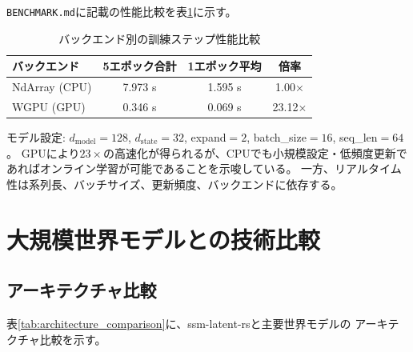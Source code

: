 \documentclass[11pt,a4paper]{ltjsarticle}
\begin{document}
\texttt{BENCHMARK.md}に記載の性能比較を表\ref{tab:benchmark}に示す。

\begin{table}[htbp]
  \centering
  \caption{バックエンド別の訓練ステップ性能比較}
  \label{tab:benchmark}
  \begin{tabular}{lccc}
    \toprule
    バックエンド & 5エポック合計 & 1エポック平均 & 倍率 \\
    \midrule
    NdArray (CPU) & 7.973 s & 1.595 s & 1.00$\times$ \\
    WGPU (GPU) & 0.346 s & 0.069 s & 23.12$\times$ \\
    \bottomrule
  \end{tabular}
\end{table}

モデル設定: $d_{\mathrm{model}}=128$, $d_{\mathrm{state}}=32$, expand$=2$,
batch\_size$=16$, seq\_len$=64$。
GPUにより$23\times$の高速化が得られるが、CPUでも小規模設定・低頻度更新であればオンライン学習が可能であることを示唆している。
一方、リアルタイム性は系列長、バッチサイズ、更新頻度、バックエンドに依存する。

\section{大規模世界モデルとの技術比較}

\subsection{アーキテクチャ比較}

表\ref{tab:architecture_comparison}に、ssm-latent-rsと主要世界モデルの
アーキテクチャ比較を示す。
\end{document}

